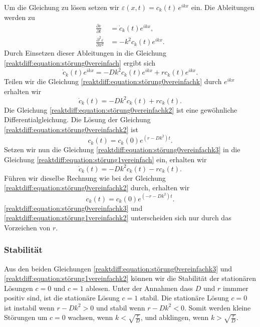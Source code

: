 Um die Gleichung zu lösen setzen wir \(\varepsilon(x,t) = c_k(t)\, e^{ikx}\) ein.
Die Ableitungen werden zu
\begin{align*}
\frac{\partial \varepsilon}{\partial t} &= \dot{c}_k(t) e^{ikx},\\
\frac{\partial^2 \varepsilon}{\partial x^2} &= -k^2 c_k(t) e^{ikx}.
\end{align*}
Durch Einsetzen dieser Ableitungen in die Gleichung \eqref{reaktdiff:equation:störung0vereinfach} ergibt sich
\begin{equation}
\label{reaktdiff:equation:störung0vereinfachk}
\dot{c}_k(t) e^{ikx} = -D k^2 c_k(t) e^{ikx} + r c_k(t) e^{ikx}.
\end{equation}
Teilen wir die Gleichung \eqref{reaktdiff:equation:störung0vereinfachk} durch \(e^{ikx}\) erhalten wir
\begin{equation}
\label{reaktdiff:equation:störung0vereinfachk2}
\dot{c}_k(t) = -D k^2 c_k(t) + r c_k(t).
\end{equation}
Die Gleichung \eqref{reaktdiff:equation:störung0vereinfachk2} ist eine gewöhnliche Differentialgleichung.
Die Lösung der Gleichung \eqref{reaktdiff:equation:störung0vereinfachk2} ist
\begin{equation}
\label{reaktdiff:equation:störung0vereinfachk3}
c_k(t) = c_k(0) e^{(r - D k^2)t}.
\end{equation}
Setzen wir nun die Gleichung \eqref{reaktdiff:equation:störung0vereinfachk3} in die Gleichung \eqref{reaktdiff:equation:störung1vereinfach} ein, erhalten wir
\begin{equation}
\label{reaktdiff:equation:störung1vereinfachk}
\dot{c}_k(t) = -D k^2 c_k(t) - r c_k(t).
\end{equation}
Führen wir dieselbe Rechnung wie bei der 
Gleichung \eqref{reaktdiff:equation:störung0vereinfachk2} durch, erhalten wir
\begin{equation}
\label{reaktdiff:equation:störung1vereinfachk2}
c_k(t) = c_k(0) e^{(-r - D k^2)t}.
\end{equation}
\eqref{reaktdiff:equation:störung0vereinfachk3} und \eqref{reaktdiff:equation:störung1vereinfachk2} unterscheiden sich nur durch das Vorzeichen von \(r\).

\subsubsection{Stabilität}
Aus den beiden Gleichungen \eqref{reaktdiff:equation:störung0vereinfachk3} und \eqref{reaktdiff:equation:störung1vereinfachk2} können wir die Stabilität der stationären Lösungen \(c = 0\) und \(c = 1\) ablesen.
%
Unter der Annahmen dass \(D\) und \(r\) immmer positiv sind, ist die stationäre Lösung \(c = 1\) stabil.
Die stationäre Lösung \(c = 0\) ist instabil wenn \(r-Dk^2 > 0\) und stabil wenn \(r-Dk^2 < 0\).
Somit werden kleine Störungen um \(c = 0\) wachsen, wenn \(k < \!\sqrt{\frac{r}{D}}\), und abklingen, wenn \(k > \!\sqrt{\frac{r}{D}}\).

